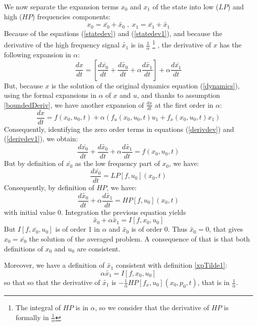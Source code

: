 \documentclass[a4paper,10pt]{article}
\begin{document}
We now separate the expansion terms $x_{0}$ and $x_{1}$ of the state 
into low ($LP$) and high 
($HP$) frequencies components:
\begin{equation}
        x_{0} = \bar{x_{0}} +\tilde{x_{0}} \; , \;
        x_{1} = \bar{x_{1}} +\tilde{x_{1}}
    \label{statedev1}
\end{equation}
Because of the equations (\ref{statedev}) and (\ref{statedev1}), and 
because  the derivative of the high frequency signal $\tilde{x_{1}}$ 
is in $\frac{1}{\alpha}$ \footnote{The integral of $HP$ is in
$\alpha$, so we consider that the derivative of $HP$ is formally in 
$\frac{1}{\alpha}$} , the derivative of $x$ has the following 
expansion in $\alpha$:
\begin{equation}
    \frac{dx}{dt} = \left[ \frac{d \bar{x_{0}}}{dt}
    + \frac{d \tilde{x_{0}}}{dt} 
    + \alpha \frac{d \tilde{x_{1}}}{dt} \right]
   + \alpha \frac{d \bar{x_{1}}}{dt}
    \label{derivdev}
\end{equation}
But, because $x$ is the solution of the original dynamics 
equation (\ref{dynamics}), using the formal expansions in $\alpha$ of $x$ 
and $u$, and thanks to assumption 
\ref{boundedDeriv}, we have another expansion of $\frac{dx}{dt}$ at 
the first order in $\alpha$:
\begin{equation}
    \frac{dx}{dt} = f(x_{0},u_{0},t) 
    + \alpha (f_{u}(x_{0},u_{0},t)u_{1} + f_{x}(x_{0},u_{0},t)x_{1})
    \label{derivdev1}
\end{equation}
Consequently, identifying the zero order terms in  equations 
(\ref{derivdev}) and (\ref{derivdev1}), we obtain:
\[
  \frac{d \bar{x_{0}}}{dt}
    + \frac{d \tilde{x_{0}}}{dt} 
    + \alpha \frac{d \tilde{x_{1}}}{dt} = f(x_{0},u_{0},t)
\]
But by definition of $\bar{x_{0}}$ as the low frequency part of 
$x_{0}$, we have:
\[
   \frac{d \bar{x_{0}}}{dt} = LP[f,u_{0}](x_{0},t)  
\]
Consequently, by definition of $HP$, we have:
\[
  \frac{d \tilde{x_{0}}}{dt} 
    + \alpha \frac{d \tilde{x_{1}}}{dt} = HP[f,u_{0}](x_{0},t)  
\]
with initial value $0$. Integration the previous equation yields
\[
    \tilde{x_{0}} + \alpha \tilde{x_{1}} = I[f,x_{0},u_{0}]
\]
But $I[f,\bar{x_{0}},u_{0}]$ is of order 1 in $\alpha$ and 
$\tilde{x_{0}}$ is of order 0. Thus $\tilde{x_{0}}=0$, that gives 
$x_{0}=\bar{x_{0}}$ the solution of the averaged problem. A 
consequence of that is that both definitions of $x_{0}$ and $u_{0}$ 
are consistent.

Moreover, we have a definition of $\tilde{x_{1}}$ consistent with 
definition \ref{xpTilde1}:
\begin{equation*}
    \alpha \tilde{x_{1}} =  I[f,x_{0},u_{0}]
\end{equation*}
so that so that the derivative of $\tilde{x_{1}}$ is 
$-\frac{1}{\alpha}HP[f_{x},u_{0}](x_{0},p_{0},t)$, that is in $\frac{1}{\alpha}$.
\end{document}
